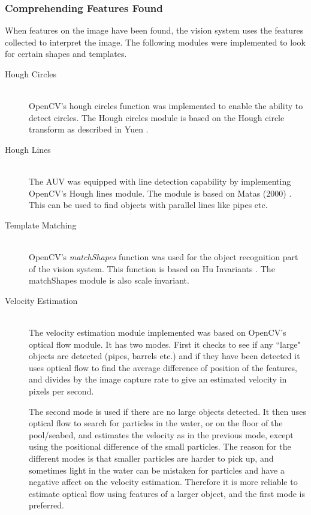 \subsubsection{Comprehending Features Found} 
When features on the image have been found, the vision system uses the features collected to interpret the image. The following modules were implemented to look for certain shapes and templates.
\begin{description}
\item[Hough Circles]\hfill \\
OpenCV's hough circles function was implemented to enable the ability to detect circles. The Hough circles module is based on the Hough circle transform as described in Yuen \cite{article:yuen}. 

\item[Hough Lines]\hfill \\
The AUV was equipped with line detection capability by implementing OpenCV's Hough lines module. The module is based on Matas (2000) \cite{article:matas}. This can be used to find objects with parallel lines like pipes etc.

\item[Template Matching]\hfill \\
OpenCV's \emph{matchShapes} function was used for the object recognition part of the vision system. This function is based on Hu Invariants \cite{article:hu}. The matchShapes module is also scale invariant.

\item[Velocity Estimation]\hfill \\
The velocity estimation module implemented was based on OpenCV's optical flow module. It has two modes. First it checks to see if any ``large" objects are detected (pipes, barrels etc.) and if they have been detected it uses optical flow to find the average difference of position of the features, and divides by the image capture rate to give an estimated velocity in pixels per second.
 
The second mode is used if there are no large objects detected. It then uses optical flow to search for particles in the water, or on the floor of the pool/seabed, and estimates the velocity as in the previous mode, except using the positional difference of the small particles. The reason for the different modes is that smaller particles are harder to pick up, and sometimes light in the water can be mistaken for particles and have a negative affect on the velocity estimation. Therefore it is more reliable to estimate optical flow using features of a larger object, and the first mode is preferred.
\end{description}

